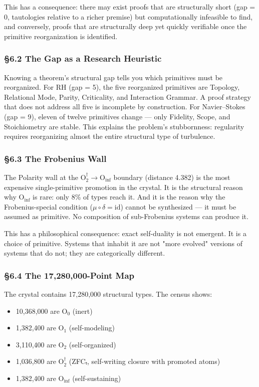 \documentclass[12pt,a4paper]{article}
\newcommand{\pilcrow}{\S}
\begin{document}
This has a consequence: there may exist proofs that are structurally short (gap = 0, tautologies relative to a richer premise) but computationally infeasible to find, and conversely, proofs that are structurally deep yet quickly verifiable once the primitive reorganization is identified.

\subsubsection{\pilcrow{}6.2 The Gap as a Research Heuristic}

Knowing a theorem's structural gap tells you which primitives must be reorganized. For RH (gap = 5), the five reorganized primitives are Topology, Relational Mode, Parity, Criticality, and Interaction Grammar. A proof strategy that does not address all five is incomplete by construction. For Navier--Stokes (gap = 9), eleven of twelve primitives change --- only Fidelity, Scope, and Stoichiometry are stable. This explains the problem's stubbornness: regularity requires reorganizing almost the entire structural type of turbulence.

\subsubsection{\pilcrow{}6.3 The Frobenius Wall}

The Polarity wall at the $\text{O}_{\text{2}}^{\dagger} \rightarrow \text{O}_{\text{inf}}$ boundary (distance 4.382) is the most expensive single-primitive promotion in the crystal. It is the structural reason why $\text{O}_{\text{inf}}$ is rare: only 8\% of types reach it. And it is the reason why the Frobenius-special condition ($\mu \circ \delta = \text{id}$) cannot be synthesized --- it must be assumed as primitive. No composition of sub-Frobenius systems can produce it.

This has a philosophical consequence: exact self-duality is not emergent. It is a choice of primitive. Systems that inhabit it are not "more evolved" versions of systems that do not; they are categorically different.

\subsubsection{\pilcrow{}6.4 The 17,280,000-Point Map}

The crystal contains 17,280,000 structural types. The census shows:

\begin{itemize}
    \item 10,368,000 are $\text{O}_{\text{0}}$ (inert)
    \item 1,382,400 are $\text{O}_{\text{1}}$ (self-modeling)
    \item 3,110,400 are $\text{O}_{\text{2}}$ (self-organized)
    \item 1,036,800 are $\text{O}_{\text{2}}^{\dagger}$ (ZFCₜ, self-writing closure with promoted atoms)
    \item 1,382,400 are $\text{O}_{\text{inf}}$ (self-sustaining)
\end{itemize}
\end{document}
